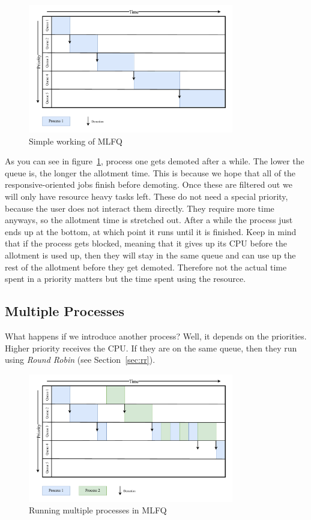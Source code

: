 \begin{figure}[h]
    \centering
    \includegraphics[width=0.8\textwidth]{Assets/MLFQ-Example-1.pdf}
    \caption{Simple working of MLFQ}
    \label{fig:mlfq-example-1}
\end{figure}


As you can see in figure~\ref{fig:mlfq-example-1}, process one gets demoted after a while.
The lower the queue is, the longer the allotment time. 
This is because we hope that all of the responsive-oriented jobs finish before demoting.
Once these are filtered out we will only have resource heavy tasks left.
These do not need a special priority, because the user does not interact them directly.
They require more time anyways, so the allotment time is stretched out.
After a while the process just ends up at the bottom, at which point it runs until it is finished.
Keep in mind that if the process gets blocked, meaning that it gives up its CPU before the allotment is used up, then they will stay in the same queue and can use up the rest of the allotment before they get demoted. Therefore not the actual time spent in a priority matters but the time spent using the resource.

\subsection{Multiple Processes}

What happens if we introduce another process?
Well, it depends on the priorities. 
Higher priority receives the CPU.
If they are on the same queue, then they run using \emph{Round Robin} (see Section~\ref{sec:rr}).


\begin{figure}[h]
    \centering
    \includegraphics[width=0.8\textwidth]{Assets/MLFQ-Example-2.pdf}
    \caption{Running multiple processes in MLFQ}
    \label{fig:mlfq-example-2}
\end{figure}

